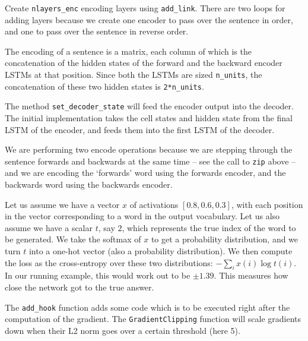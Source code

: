 \documentclass[answers]{exam}
\begin{document}
\begin{CJK}{UTF8}{min}
\begin{questions}

\begin{framed}
\begin{compactenum}[A.]
  \item
    Create \texttt{nlayers\_enc} encoding layers using \texttt{add\_link}. There
    are two loops for adding layers because we create one encoder to pass over
    the sentence in order, and one to pass over the sentence in reverse order.
  \item
    The encoding of a sentence is a matrix, each column of which is the
    concatenation of the hidden states of the forward and the backward encoder
    LSTMs at that position. Since both the LSTMs are sized \texttt{n\_units},
    the concatenation of these two hidden states is \texttt{2*n\_units}.
  \item
    The method \texttt{set\_decoder\_state} will feed the encoder output into
    the decoder. The initial implementation takes the cell states and hidden
    state from the final LSTM of the encoder, and feeds them into the first LSTM
    of the decoder.
  \item
    We are performing two encode operations because we are stepping through the
    sentence forwards and backwards at the same time -- see the call to
    \texttt{zip} above -- and we are encoding the `forwards' word using the
    forwards encoder, and the backwards word using the backwards encoder.
  \item
    Let us assume we have a vector $x$ of activations $[0.8, 0.6, 0.3]$,
    with each position in the vector corresponding to a word in 
    the output vocabulary. Let us also assume we have a scalar $t$, say $2$,
    which represents the true index of the word to be generated.
    We take the softmax of $x$ to get a probability distribution, and we turn
    $t$ into a one-hot vector (also a probability distribution).
    We then compute the loss as the cross-entropy over these two distributions:
    $-\sum_{i} x(i) \log{t(i)}$. In our running example, this would work out to
    be $\pm 1.39$. This measures how close the network got to the true answer.  
  \item
    The \texttt{add\_hook} function adds some code which is to be executed right
    after the computation of the gradient. The \texttt{GradientClipping}
    function will scale gradients down when their L2 norm goes over a certain
    threshold (here 5).
\end{compactenum}
\end{framed}



\end{questions}
\end{CJK}
\end{document}
